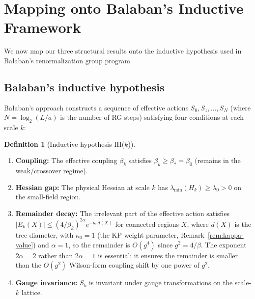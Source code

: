 \documentclass[11pt]{article}
\theoremstyle{definition}
\newtheorem{definition}[theorem]{Definition}
\begin{document}
\section{Mapping onto Balaban's Inductive Framework}\label{sec:roadmap}

We now map our three structural results onto the inductive hypothesis
used in Ba\l aban's renormalization group program.

\subsection{Balaban's inductive hypothesis}

Ba\l aban's approach constructs a sequence of effective actions
$S_0,S_1,\ldots,S_N$ (where $N=\log_2(L/a)$ is the number of RG steps)
satisfying four conditions at each scale $k$:

\begin{definition}[Inductive hypothesis IH($k$)]\label{def:IH}
\begin{enumerate}[nosep,label=(IH\arabic*)]
\item \textbf{Coupling:}
The effective coupling $\beta_k$ satisfies $\beta_k\ge\beta_*=\beta_0$ (remains
in the weak/crossover regime).
\item \textbf{Hessian gap:}
The physical Hessian at scale $k$ has
$\lambda_{\min}(H_k)\ge\lambda_0>0$ on the small-field region.
\item \textbf{Remainder decay:}
The irrelevant part of the effective action satisfies
$|E_k(X)|\le(4/\beta_k)^{2\alpha}e^{-\kappa_0 d(X)}$ for connected
regions $X$, where $d(X)$ is the tree diameter, with $\kappa_0=1$ (the KP weight parameter,
Remark~\ref{rem:kappa-value}) and $\alpha=1$,
so the remainder is $O(g^4)$ since $g^2=4/\beta$.
The exponent $2\alpha=2$ rather than $2\alpha=1$
is essential: it ensures the remainder is smaller than the
$O(g^2)$ Wilson-form coupling shift by one power of $g^2$.
\item \textbf{Gauge invariance:}
$S_k$ is invariant under gauge transformations on the scale-$k$ lattice.
\end{enumerate}
\end{definition}
\end{document}
